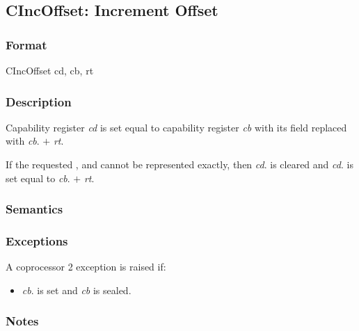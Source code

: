 \clearpage
{}
{}
\subsection*{CIncOffset: Increment Offset}

\subsubsection*{Format}

CIncOffset cd, cb, rt

\begin{center}
\end{center}

\subsubsection*{Description}

Capability register \emph{cd} is set equal to capability register
\emph{cb} with its \coffset{} field replaced with \emph{cb}.\coffset{} $+$
\emph{rt}.

If the requested \cbase{}, \clength{}
and \coffset{} cannot be represented exactly, then \emph{cd}.\ctag{} is
cleared and \emph{cd}.\ccursor{} is set equal to
\emph{cb}.\ccursor{} $+$ \emph{rt}.

\subsubsection*{Semantics}

\subsubsection*{Exceptions}

A coprocessor 2 exception is raised if:

\begin{itemize}
\item
\emph{cb}.\ctag{} is set and \emph{cb} is sealed.
\end{itemize}

\subsubsection*{Notes}

